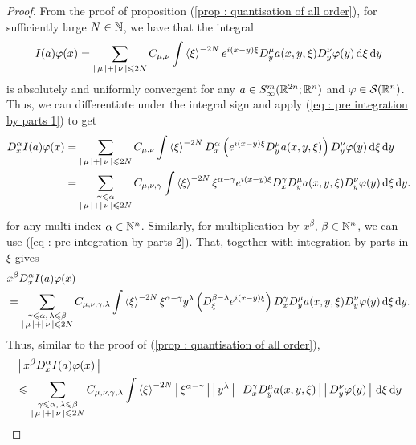 \documentclass[12pt]{article}
\begin{document}
\begin{proof}
    From the  proof of proposition (\ref{prop : quantisation of all order}), for sufficiently large $N \in \N$, we have that the integral
    \begin{align*}
     I(a)\varphi(x)    
     &=  \sum_{\abs{\mu} + \abs{\nu} \leq 2N} C_{\mu, \nu} \int \sym[\xi]^{-2N} e^{i (x - y) \xi }  D^\mu_y a(x, y, \xi) D^\nu_{y} \varphi(y) \d[\xi] \d[y]\\
    \end{align*}
    is absolutely and uniformly convergent for any $a \in S^{m}_{\infty}(\R^{2n}; \R^{n})$ and $\varphi \in \sch(\R^n)$. Thus, we can differentiate under the integral sign and apply (\ref{eq : pre integration by parts 1}) to get
    \begin{align*}
    D^\alpha_x I(a)\varphi(x) 
    & = \sum_{\abs{\mu} + \abs{\nu} \leq 2N} C_{\mu, \nu} \int \sym[\xi]^{-2N}D^\alpha_x \brac{e^{i (x - y) \xi }  D^\mu_y a(x, y, \xi)} D^\nu_{y} \varphi(y) \d[\xi] \d[y]\\
    & = \sum_{\substack{\gamma \leq \alpha \\ \abs{\mu} + \abs{\nu} \leq 2N}} C_{\mu, \nu, \gamma} \int \sym[\xi]^{-2N}\xi^{\alpha - \gamma} e^{i (x - y) \xi }  D^{\gamma}_x D^\mu_y a(x, y, \xi)  D^\nu_{y} \varphi(y) \d[\xi] \d[y]. 
    \end{align*}
    for any multi-index $\alpha \in \N^n$. Similarly, for multiplication by $x^\beta$, $\beta \in \N^n$, we can use  (\ref{eq : pre integration by parts 2}). That, together with integration by parts in $\xi$ gives
    \begin{align*}
    & x^\beta D^\alpha_x I(a)\varphi(x) \\
    & = \sum_{\substack{\gamma \leq \alpha, \, \lambda \leq \beta \\ \abs{\mu} + \abs{\nu} \leq 2N}} C_{\mu, \nu, \gamma, \lambda} \int \sym[\xi]^{-2N}\xi^{\alpha - \gamma} y^\lambda \brac{D^{\beta - \lambda}_\xi e^{i (x - y) \xi }}  D^{\gamma}_x D^\mu_y a(x, y, \xi)  D^\nu_{y} \varphi(y) \d[\xi] \d[y]. 
    \end{align*}
    Thus, similar to the proof of (\ref{prop : quantisation of all order}), 
    \begin{align*}
    & \abs{x^\beta D^\alpha_x I(a)\varphi(x)} \\
    & \leq \sum_{\substack{\gamma \leq \alpha, \, \lambda \leq \beta \\ \abs{\mu} + \abs{\nu} \leq 2N}} C_{\mu, \nu, \gamma, \lambda} \int \sym[\xi]^{-2N} \abs{\xi^{\alpha - \gamma}} \abs{y^\lambda} \abs{D^{\gamma}_x D^\mu_y a(x, y, \xi)} \abs{ D^\nu_{y} \varphi(y)} \d[\xi] \d[y] \\

\end{align*}
\end{proof}
\end{document}

